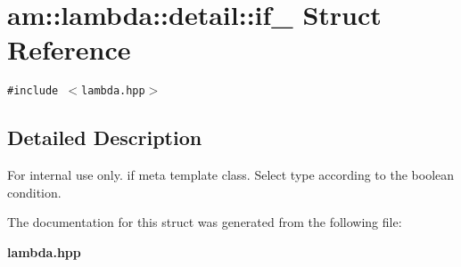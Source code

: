 \section{am::lambda::detail::if\_\- Struct Reference}
\label{structam_1_1lambda_1_1detail_1_1if__}
{\tt \#include $<$lambda.hpp$>$}



\subsection{Detailed Description}
\begin{Desc}
\item[For internal use only.]
if meta template class. Select type according to the boolean condition. \end{Desc}




The documentation for this struct was generated from the following file:\begin{CompactItemize}
\item 
{\bf lambda.hpp}\end{CompactItemize}
